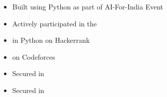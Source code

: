 \begin{itemize}

\item Built {\color{black}{Face Recognition Application}} using Python as part of AI-For-India Event \hspace{0.02cm}\href{https://drive.google.com/file/d/1q9WP5xx7kuSTW7HYrq970K8WuJ2H7Ejk/view?usp=sharing}{\color{coolblack}{\ExternalLink}}
\smallskip
\item Actively participated in the {\color{black}{Aadhaar Hackathon 2021}} \hspace{0.02cm}\href{https://drive.google.com/file/d/1iCwc_kli1NQf6AvqOtJtQAIXhbIFLLa4/view?usp=sharing}{\color{coolblack}{\ExternalLink}}
\smallskip
\item  {\color{black}{Gold Level}} in Python on Hackerrank \hspace{0.02cm}\href{https://www.hackerrank.com/aaryan20004}{\color{coolblack}{\ExternalLink}}
\smallskip
\item  {\color{black}{Newbie}} on Codeforces \hspace{0.02cm}\href{https://codeforces.com/profile/aaryan20004}{\color{coolblack}{\ExternalLink}}
\smallskip
\item Secured {\color{black}{AIR 3557}} in {\color{black}{JEE Advanced'20}} \hspace{0.02cm}\href{https://drive.google.com/file/d/1C0RV0-QyR0lyoy0MCRRJkPFg5IUw6Rcx/view?usp=sharing}{\color{coolblack}{\ExternalLink}}
\smallskip
\item Secured {\color{black}{AIR 8178}} in {\color{black}{JEE Mains'20}} \hspace{0.02cm}\href{https://drive.google.com/file/d/1SHi1crn0DNcFnNvRZ93yHAJLDSAtZKkl/view?usp=sharing}{\color{coolblack}{\ExternalLink}}

\end{itemize}





